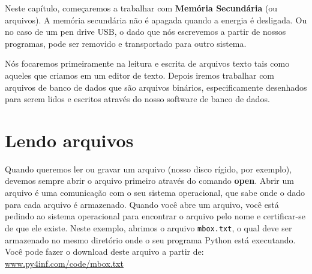 Neste capítulo, começaremos a trabalhar com {\bf Memória Secundária}
(ou arquivos).
A memória secundária não é apagada quando a energia é desligada.
Ou no caso de um pen drive USB, o
dado que nós escrevemos a partir de nossos programas, pode ser
removido e transportado para outro sistema.

Nós focaremos primeiramente na leitura e escrita de arquivos texto
tais como aqueles que criamos em um editor de texto. Depois iremos
trabalhar com arquivos de banco de dados que são arquivos binários,
especificamente desenhados para serem lidos e escritos através do nosso
software de banco de dados.

\section{Lendo arquivos}

Quando queremos ler ou gravar um arquivo (nosso disco rígido, por exemplo),
devemos sempre abrir o arquivo primeiro através do comando {\bf open}. Abrir um
arquivo é uma comunicação com o seu sistema operacional, que sabe onde o dado
para cada arquivo é armazenado. Quando você abre um arquivo, você está pedindo
ao sistema operacional para encontrar o arquivo pelo nome e certificar-se de que
ele existe. Neste exemplo, abrimos o arquivo {\tt mbox.txt}, o qual deve ser armazenado
no mesmo diretório onde o seu programa Python está executando.
Você pode fazer o download deste arquivo a partir de:
\url{www.py4inf.com/code/mbox.txt}

